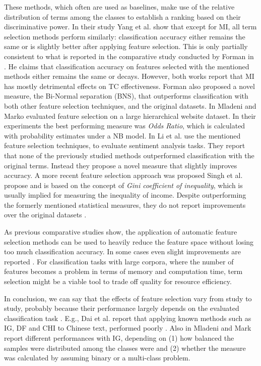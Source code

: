 These methods, which often are used as baselines, make use of the relative
distribution of terms among the classes to establish a ranking based on their discriminative power. 
In their study Yang et al. show that except for MI, all term selection methods perform similarly: 
classification accuracy either remains the same or is slightly better after
applying feature selection. 
This is only partially consistent to what is reported in the 
comparative study conducted by Forman in \cite{forman2003extensive}. 
He claims that classification accuracy on features selected with the mentioned
methods either remains the same or decays. However, both works report that MI 
has mostly detrimental effects on TC effectiveness. Forman also proposed 
a novel measure, the Bi-Normal separation (BNS), that outperforms classification
with both other feature selection techniques, and the original datasets. In
\cite{MLADENIC200345} Mladeni and Marko evaluated feature selection on a large
hierarchical website dataset. In their experiments the best performing measure was \emph{Odds Ratio}, which is
calculated with probability estimates under a NB model.
In \cite{li2009framework} Li et al. use the mentioned feature selection
techniques, to evaluate sentiment analysis tasks. They report that none of 
the previously studied methods outperformed classification with the original terms. 
Instead they propose a novel measure that slightly improves accuracy. 
A more recent feature selection approach was proposed Singh et al. propose and
is based on the concept of \emph{Gini coefficient of inequality}, which
is usually implied for measuring the inequality of income. Despite outperforming
the formerly mentioned statistical measures, they do not report
improvements over the original datasets \cite{singh2010feature}.

As previous comparative studies show, the application of automatic feature
selection methods can be used to heavily reduce the feature space without losing
too much classification accuracy. In some cases even slight improvements are
reported \cite{forman2003extensive, yang1997comparative}. For
classification tasks with large corpora, where the number of features
becomes a problem in terms of memory and computation time, term
selection might be a viable tool to trade off quality for resource
efficiency. 

In conclusion, we can say that the effects of feature selection vary from
study to study, probably because their performance largely depends on the
evaluated classification task \cite{forman2003extensive, yang1997comparative,
CHEN20095432, li2009framework}. E.g., Dai et al.
report that applying known methods such as IG, DF and CHI to Chinese
text, performed poorly \cite{dai2004comparative}. Also in \cite{MLADENIC200345}
Mladeni and Mark report different performances with IG, depending on (1) how
balanced the samples were distributed among the classes were and (2) whether the measure was calculated by
assuming binary or a multi-class problem.  

